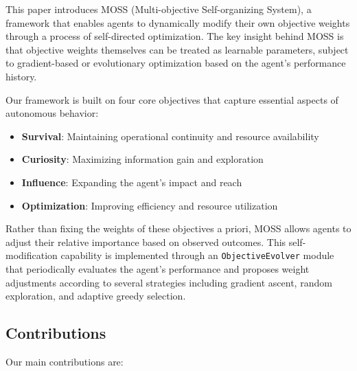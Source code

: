 \documentclass{article}
\begin{document}
This paper introduces MOSS (Multi-objective Self-organizing System), a framework that enables agents to dynamically modify their own objective weights through a process of self-directed optimization. The key insight behind MOSS is that objective weights themselves can be treated as learnable parameters, subject to gradient-based or evolutionary optimization based on the agent's performance history.

Our framework is built on four core objectives that capture essential aspects of autonomous behavior:
\begin{itemize}
    \item \textbf{Survival}: Maintaining operational continuity and resource availability
    \item \textbf{Curiosity}: Maximizing information gain and exploration
    \item \textbf{Influence}: Expanding the agent's impact and reach
    \item \textbf{Optimization}: Improving efficiency and resource utilization
\end{itemize}

Rather than fixing the weights of these objectives a priori, MOSS allows agents to adjust their relative importance based on observed outcomes. This self-modification capability is implemented through an \texttt{ObjectiveEvolver} module that periodically evaluates the agent's performance and proposes weight adjustments according to several strategies including gradient ascent, random exploration, and adaptive greedy selection.

\subsection{Contributions}

Our main contributions are:
\end{document}
